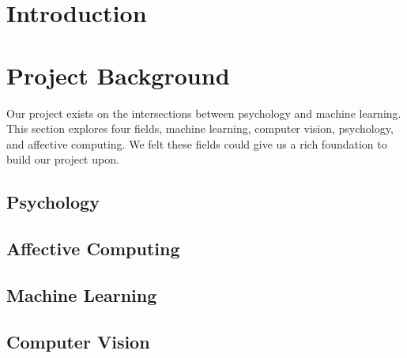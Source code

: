 \documentclass{article}
\begin{document}



\tableofcontents

\newpage

\section{Introduction}



\section{Project Background}
Our project exists on the intersections between psychology and machine learning.
This section explores four fields, machine learning, computer vision, psychology, and affective computing.
We felt these fields could give us a rich foundation to build our project upon.


\subsection{Psychology}


\subsection{Affective Computing}


\subsection{Machine Learning}


\subsection{Computer Vision}  \label{section:cv}

\end{document}
